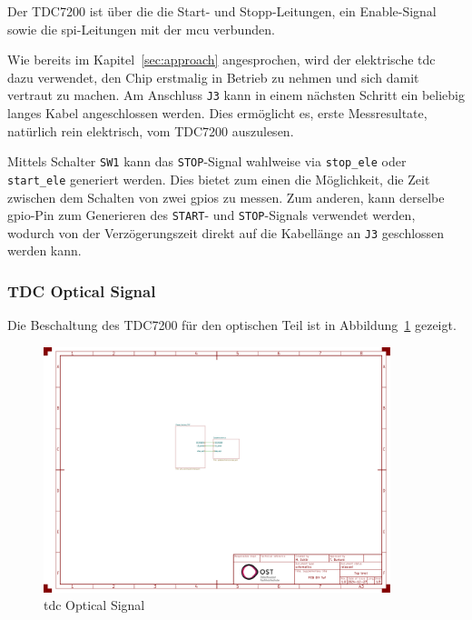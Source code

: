 Der TDC7200 ist über die die Start- und Stopp-Leitungen, ein Enable-Signal sowie die \acrshort{spi}-Leitungen mit der
\acrshort{mcu} verbunden.

Wie bereits im Kapitel~\ref{sec:approach} angesprochen, wird der elektrische \acrshort{tdc} dazu verwendet, den Chip
erstmalig in Betrieb zu nehmen und sich damit vertraut zu machen. Am Anschluss \lstinline|J3| kann in einem nächsten
Schritt ein beliebig langes Kabel angeschlossen werden. Dies ermöglicht es, erste Messresultate, natürlich rein elektrisch,
vom TDC7200 auszulesen.

Mittels Schalter \lstinline|SW1| kann das \lstinline|STOP|-Signal wahlweise via \lstinline|stop_ele| oder
\lstinline|start_ele| generiert werden. Dies bietet zum einen die Möglichkeit, die Zeit zwischen dem Schalten von zwei
\acrshort{gpio}s zu messen. Zum anderen, kann derselbe \acrshort{gpio}-Pin zum Generieren des \lstinline|START|- und
\lstinline|STOP|-Signals verwendet werden, wodurch von der Verzögerungszeit direkt auf die Kabellänge an \lstinline|J3|
geschlossen werden kann.

\subsubsection{TDC Optical Signal}

Die Beschaltung des TDC7200 \cite{ti2016tdc7200_datasheet} für den optischen Teil ist in
Abbildung~\ref{fig:tdc_opt_signal} gezeigt.

\begin{figure}[H]
    \centering
    \includegraphics[page=2, trim=530 330 300 310, clip, width=0.9\textwidth]{attachments/schematic.pdf}
    \caption{\acrshort{tdc} Optical Signal}\label{fig:tdc_opt_signal}
\end{figure}


